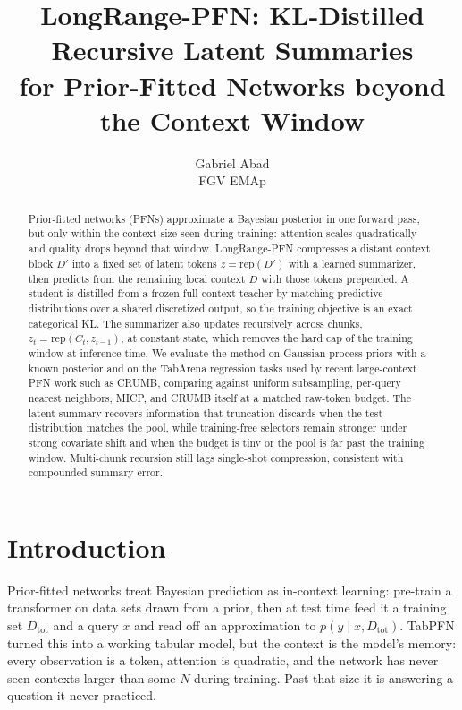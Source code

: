 \documentclass{article}
\title{LongRange-PFN: KL-Distilled Recursive Latent Summaries\\
for Prior-Fitted Networks beyond the Context Window}
\author{%
  Gabriel Abad \\
  FGV EMAp \\
}
\newcommand{\Dtot}{D_{\mathrm{tot}}}
\newcommand{\Dfar}{D'}
\newcommand{\Dloc}{D}
\newcommand{\rep}{\mathrm{rep}}
\begin{document}
\maketitle

\begin{abstract}
Prior-fitted networks (PFNs) approximate a Bayesian posterior in one forward
pass, but only within the context size seen during training: attention scales
quadratically and quality drops beyond that window. LongRange-PFN compresses a
distant context block $\Dfar$ into a fixed set of latent tokens
$z = \rep(\Dfar)$ with a learned summarizer, then predicts from the remaining
local context $\Dloc$ with those tokens prepended. A student is distilled from
a frozen full-context teacher by matching predictive distributions over a
shared discretized output, so the training objective is an exact categorical
KL. The summarizer also updates recursively across chunks,
$z_t = \rep(C_t, z_{t-1})$, at constant state, which removes the hard cap of
the training window at inference time. We evaluate the method on Gaussian
process priors with a known posterior and on the TabArena regression tasks
used by recent large-context PFN work such as CRUMB, comparing against uniform
subsampling, per-query nearest neighbors, MICP, and CRUMB itself at a matched
raw-token budget. The latent summary recovers information that truncation
discards when the test distribution matches the pool, while training-free
selectors remain stronger under strong covariate shift and when the budget is
tiny or the pool is far past the training window. Multi-chunk recursion still
lags single-shot compression, consistent with compounded summary error.
\end{abstract}

\section{Introduction}
\label{sec:intro}


Prior-fitted networks \citep{muller2022pfn} treat Bayesian prediction as
in-context learning: pre-train a transformer on data sets drawn from a
prior, then at test time feed it a training set $\Dtot$ and a query $x$ and
read off an approximation to $p(y \mid x, \Dtot)$. TabPFN
\citep{hollmann2023tabpfn, hollmann2025tabpfn} turned this into a working
tabular model, but the context is the model's memory: every observation is
a token, attention is quadratic, and the network has never seen contexts
larger than some $N$ during training. Past that size it is answering a
question it never practiced.
\end{document}
